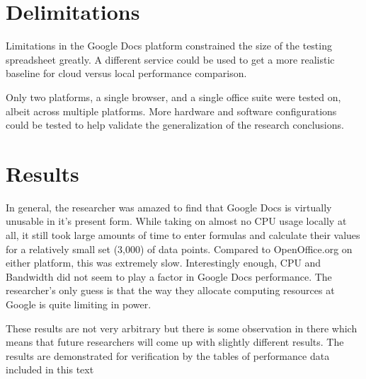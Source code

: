 

\section{Delimitations}


Limitations in the Google Docs platform constrained the size of the testing
spreadsheet greatly.  A different service could be used to get a more realistic
baseline for cloud versus local performance comparison.

Only two platforms, a single browser, and a single office suite were tested on,
albeit across multiple platforms.  More hardware and software configurations
could be tested to help validate the generalization of the research conclusions.

\section{Results}

In general, the researcher was amazed to find that Google Docs is virtually
unusable in it's present form.  While taking on almost no CPU usage locally at
all, it still took large amounts of time to enter formulas and calculate their
values for a relatively small set (3,000) of data points.  Compared to
OpenOffice.org on either platform, this was extremely slow.  Interestingly
enough, CPU and Bandwidth did not seem to play a factor in Google Docs
performance.  The researcher's only guess is that the way they allocate
computing resources at Google is quite limiting in power.

These results are not very arbitrary but there is some observation in there
which means that future researchers will come up with slightly different
results.  The results are demonstrated for verification by the tables of
performance data included in this text
